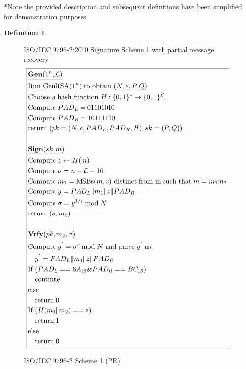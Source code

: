 \documentclass[]{final_report}
\theoremstyle{definition}
\newtheorem{definition}{Definition}[chapter]
\begin{document}
*Note the provided description and subsequent definitions have been simplified for demonstration purposes.

\begin{definition}
\begin{figure}[H]
\centering
\hfill ISO/IEC 9796-2:2010 Signature Scheme 1 with partial message recovery\hfill\phantom{} 
\[
\boxed{
\begin{aligned}
&\underline{\textbf{\text{Gen}} (1^n, \mathcal{L})} \\
&\text{Run GenRSA}(1^n) \text{ to obtain } (N, e, P, Q) \\
&\text{Choose a hash function } H : \{0, 1\}^* \rightarrow \{0, 1\}^\mathcal{L}. \\
&\text{Compute } PAD_{L} = 01101010 \\
&\text{Compute } PAD_{R} = 10111100 \\
&\text{return } (pk = (N, e, PAD_{L}, PAD_{R}, H), sk = (P, Q)) \\
\\
&\underline{\textbf{\text{Sign}} (sk, m)} \\
&\text{Compute } z \leftarrow H(m) \\
&\text{Compute } \nu = n - \mathcal{L} - 16 \\
&\text{Compute } m_{1} = \text{MSBs}(m, v) \text{ distinct from m such that } m = m_{1} m_{2} \\
&\text{Compute } y = PAD_{L} \| m_{1} \| z \| PAD_{R} \\
&\text{Compute } \sigma = y^{1/e} \bmod N \\
&\text{return } (\sigma, m_{2}) \\
\\
&\underline{\textbf{\text{Vrfy}} (pk, m_{2}, \sigma)} \\
&\text{Compute } y^{'} = \sigma^{e} \bmod N \text{ and parse } y^{'} \text{ as: } \\
&\quad y^{'} = PAD_{L} \| m_{1} \| z \| PAD_{R} \\
&\text{If } (PAD_{L} == 6A_{16} \& PAD_{R} == BC_{16}) \\
&\quad \text{continue} \\ 
&\text{else} \\
&\quad \text{return } 0 \\
&\text{If } (H(m_{1} \| m_{2}) == z) \\
&\quad \text{return } 1 \\
&\text{else} \\
&\quad \text{return } 0 
\end{aligned}
}
\]
\caption{ISO/IEC 9796-2 Scheme 1 (PR)}
\label{fig:isoiec9796}
\end{figure}
\end{definition}
\end{document}
